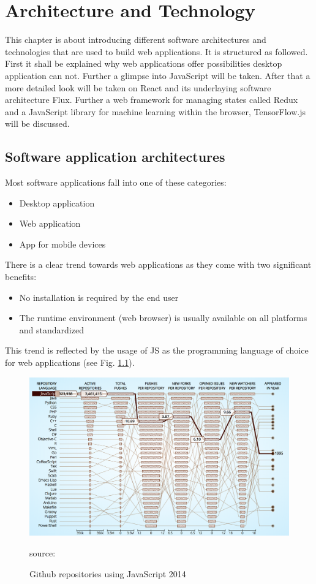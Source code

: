 \chapter{Architecture and Technology}
This chapter is about introducing different software architectures and technologies that are used to build web applications. It is structured as followed. First it shall be explained why web applications offer possibilities desktop application can not. Further a glimpse into JavaScript will be taken. After that a more detailed look will be taken on React and its underlaying software architecture Flux. Further a web framework for managing states called Redux and a JavaScript library for machine learning within the browser, TensorFlow.js will be discussed.

\section{Software application architectures}
Most software applications fall into one of these
categories:

\begin{itemize}
	\item Desktop application
	\item Web application
	\item App for mobile devices
\end{itemize}

There is a clear trend towards web applications as they come
with two significant benefits:

\begin{itemize}
	\item No installation is required by the end user
	\item The runtime environment (web browser) is usually
	      available on all platforms and standardized
\end{itemize}

This trend is reflected by the usage of \gls{JS} as 
the programming language of choice for web applications 
(see Fig. \ref{fig:JSgithub}).
\begin{figure}[ht]
	\centering
	\includegraphics[width=\linewidth]{bilder/grundlagen/jsUsage.png}
	\caption{Github repositories using JavaScript 2014} source:\cite{GitHut}
	\label{fig:JSgithub}
\end{figure}

